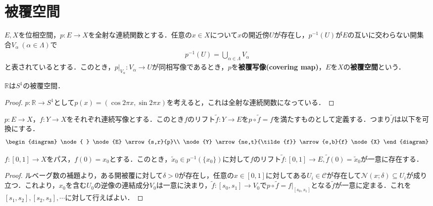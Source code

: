 \documentclass[uplatex]{jsarticle}
\renewcommand{\restriction}[2]{\left. #1 \right|_{#2}}
\begin{document}
\fi

\section{被覆空間}
\begin{teigi}[被覆空間]
  $E,X$を位相空間，$p\colon E \to X$を全射な連続関数とする．任意の$x\in X$について$x$の開近傍$U$が存在し，$p^{-1}(U)$が$E$の互いに交わらない開集合$V_\alpha\ (\alpha \in \Lambda)$で
  \begin{align*}
    p^{-1}(U) = \bigcup_{\alpha \in \Lambda} V_\alpha
  \end{align*}
  と表されているとする．このとき，$\restriction{p}{V_\alpha} \colon V_\alpha \to U$が同相写像であるとき，$p$を\textbf{被覆写像(covering map)}，$E$を$X$の\textbf{被覆空間}という．
\end{teigi}

\begin{rei}
  $\mathbb{R}$は$S^1$の被覆空間．
\end{rei}
\begin{proof}
  $p\colon \mathbb{R} \to S^1$として$p(x) = (\cos 2\pi x,\sin 2\pi x)$を考えると，これは全射な連続関数になっている．
\end{proof}

\begin{teigi}[リフト]
  $p\colon E\to X$，$f\colon Y\to X$をそれぞれ連続写像とする．このとき$f$のリフト$\tilde{f}\colon Y\to E$を$p\circ \tilde{f} = f$を満たすものとして定義する．つまり$\tilde{f}$は以下を可換にする．
  \begin{align*}
    \begin{diagram}
      \node{ } \node{E} \arrow{s,r}{p}\\
      \node{Y} \arrow{ne,t}{\tilde{f}} \arrow{e,b}{f} \node{X}
    \end{diagram}
  \end{align*}
\end{teigi}

\begin{teiri}
  $f\colon \left[0,1\right]\to X$をパス，$f(0)=x_0$とする．このとき，$\tilde{x}_0 \in p^{-1}(\{x_0\})$に対して$f$のリフト$\tilde{f}\colon \left[0,1\right]\to E,\tilde{f}(0)=\tilde{x}_0$が一意に存在する．
\end{teiri}
\begin{proof}
  ルベーグ数の補題より，ある開被覆に対して$\delta > 0$が存在し，任意の$x \in \left[0,1\right]$に対してある$U_i \in\mathcal{C}$が存在して$\mathcal{N}(x;\delta) \subseteq U_i$が成り立つ．これより，$x_0$を含む$U_0$の逆像の連結成分$V_0$は一意に決まり，$\tilde{f}\colon \left[s_0,s_1\right]\to V_0$で$p\circ \tilde{f} = \restriction{f}{\left[s_0,s_1\right]}$となる$\tilde{f}$が一意に定まる．これを$\left[s_1,s_2\right],\left[s_2,s_3\right],\cdots$に対して行えばよい．
\end{proof}
\end{document}
